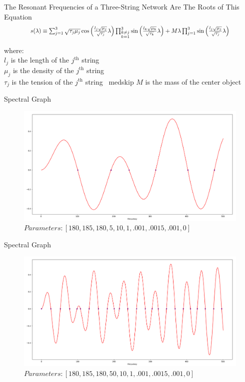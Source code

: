 \documentclass{beamer}
\begin{document}
\begin{frame}{The Resonant Frequencies of a Three-String Network Are The Roots of This Equation}
    \begin{align*}
    \scalebox{0.85}{
    $s(\lambda) \equiv \sum_{j=1}^3\sqrt{\tau_j\mu_j} \cos\left(\frac{l_j\sqrt{\mu_j}}{\sqrt{\tau_j}}\lambda\right)\prod_{\substack{k\neq j \\ k=1}}^3 \sin\left(\frac{l_k\sqrt{\mu_k}}{\sqrt{\tau_k}}\lambda\right) + M\lambda \prod_{j=1}^3\sin\left(\frac{l_j\sqrt{\mu_j}}{\sqrt{\tau_j}}\lambda\right)$
    }
    \end{align*}
    
    where: \\
    \medskip
    $l_j$ is the length of the $j^{\text{th}}$ string \\
    \medskip
    $\mu_j$ is the density of the $j^{\text{th}}$ string \\
    \medskip
    $\tau_j$ is the tension of the $j^{\text{th}}$ string 
    $M$ is the mass of the center object \\
    \medskip
    \parencite{Brahmi(2019)}
\end{frame}
\begin{frame}{Spectral Graph}
    \begin{figure}
    \centering
    \includegraphics[width=\textwidth,height=.8\textheight,keepaspectratio]{length_5.png}
    \caption{$Parameters: [180, 185, 180, 5, 10, 1, .001, .0015, .001, 0]$ }
    \end{figure}
\end{frame}
\begin{frame}{Spectral Graph}
    \begin{figure}
    \centering
    \includegraphics[width=\textwidth,height=.8\textheight,keepaspectratio]{length_50.png}
    \caption{$Parameters: [180, 185, 180, 50, 10, 1, .001, .0015, .001, 0]$ }
    \end{figure}
\end{frame}
\end{document}

